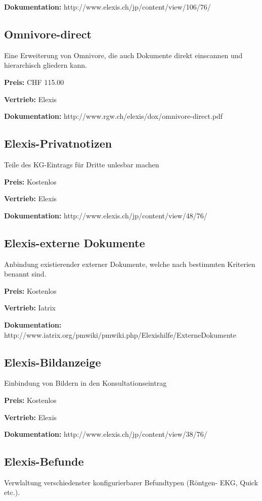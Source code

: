 \documentclass[paper=a4,BCOR8.25mm]{scrartcl}
\begin{document}
\textbf{Dokumentation:} http://www.elexis.ch/jp/content/view/106/76/

\subsection{Omnivore-direct}
Eine Erweiterung von Omnivore, die auch Dokumente direkt einscannen und hierarchisch gliedern kann.

\textbf{Preis:} CHF 115.00

\textbf{Vertrieb:} Elexis

\textbf{Dokumentation:} http://www.rgw.ch/elexis/dox/omnivore-direct.pdf

\subsection{Elexis-Privatnotizen}
Teile des KG-Eintrags für Dritte unlesbar machen

\textbf{Preis:} Kostenlos

\textbf{Vertrieb:} Elexis

\textbf{Dokumentation:} http://www.elexis.ch/jp/content/view/48/76/


\subsection{Elexis-externe Dokumente}
Anbindung existierender externer Dokumente, welche nach bestimmten Kriterien benannt sind.

\textbf{Preis:} Kostenlos

\textbf{Vertrieb:} Iatrix

\textbf{Dokumentation:} http://www.iatrix.org/pmwiki/pmwiki.php/Elexishilfe/ExterneDokumente

\subsection{Elexis-Bildanzeige}
Einbindung von Bildern in den Konsultationseintrag

\textbf{Preis:} Kostenlos

\textbf{Vertrieb:} Elexis

\textbf{Dokumentation:} http://www.elexis.ch/jp/content/view/38/76/

\subsection{Elexis-Befunde}
Verwlaltung verschiedenster konfigurierbarer Befundtypen (Röntgen- EKG, Quick etc.).
\end{document}
